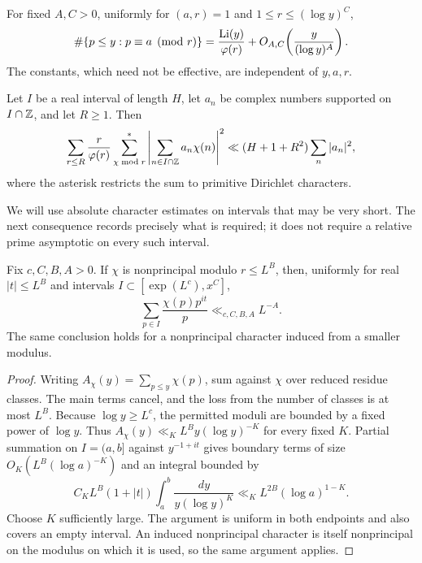 \begin{theorem}\label{thm:sw}
For fixed $A,C>0$, uniformly for $(a,r)=1$ and
$1\le r\le(\log y)^C$,
\[
 \#\{p\le y:p\equiv a\pmod r\}
 =\frac{\operatorname{Li}(y)}{\varphi(r)}
  +O_{A,C}\!\left(\frac{y}{(\log y)^A}\right).
\]
The constants, which need not be effective, are independent of $y,a,r$.
\end{theorem}

\begin{theorem}\label{thm:large-sieve}
Let $I$ be a real interval of length $H$, let $a_n$ be complex numbers
supported on $I\cap\mathbb Z$, and let $R\ge1$. Then
\[
 \sum_{r\le R}\frac r{\varphi(r)}
 \sum_{\chi\bmod r}^{*}
 \left|\sum_{n\in I\cap\mathbb Z}a_n\chi(n)\right|^2
 \ll (H+1+R^2)\sum_n|a_n|^2,
\]
where the asterisk restricts the sum to primitive Dirichlet characters.
\end{theorem}

We will use absolute character estimates on intervals that may be very
short. The next consequence records precisely what is required; it
does not require a relative prime asymptotic on every such interval.

\begin{corollary}\label{cor:harmonic-sw}
Fix $c,C,B,A>0$. If $\chi$ is nonprincipal modulo $r\le L^B$, then,
uniformly for real $|t|\le L^B$ and intervals
$I\subset[\exp(L^c),x^C]$,
\[
 \sum_{p\in I}\frac{\chi(p)p^{it}}p\ll_{c,C,B,A}L^{-A}.
\]
The same conclusion holds for a nonprincipal character induced from a
smaller modulus.
\end{corollary}

\begin{proof}
Writing $A_\chi(y)=\sum_{p\le y}\chi(p)$, sum
 against $\chi$ over reduced residue classes. The main
terms cancel, and the loss from the number of classes is at most $L^B$.
Because $\log y\ge L^c$, the permitted moduli are bounded by a fixed
power of $\log y$. Thus $A_\chi(y)\ll_K L^B y(\log y)^{-K}$ for every
fixed $K$. Partial summation on $I=(a,b]$ against $y^{-1+it}$ gives
boundary terms of size $O_K(L^B(\log a)^{-K})$ and an integral bounded by
\[
 C_KL^B(1+|t|)\int_a^b\frac{dy}{y(\log y)^K}
 \ll_K L^{2B}(\log a)^{1-K}.
\]
Choose $K$ sufficiently large. The argument is uniform in both
endpoints and also covers an empty interval. An induced nonprincipal
character is itself nonprincipal on the modulus on which it is used,
so the same argument applies.
\end{proof}

